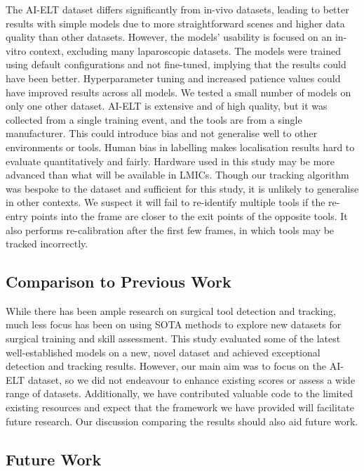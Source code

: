 The AI-ELT dataset differs significantly from in-vivo datasets, leading to better results with simple models due to more straightforward scenes and higher data quality than other datasets. However, the models' usability is focused on an in-vitro context, excluding many laparoscopic datasets. The models were trained using default configurations and not fine-tuned, implying that the results could have been better. Hyperparameter tuning and increased patience values could have improved results across all models. We tested a small number of models on only one other dataset. AI-ELT is extensive and of high quality, but it was collected from a single training event, and the tools are from a single manufacturer. This could introduce bias and not generalise well to other environments or tools. Human bias in labelling makes localisation results hard to evaluate quantitatively and fairly. Hardware used in this study may be more advanced than what will be available in LMICs. Though our tracking algorithm was bespoke to the dataset and sufficient for this study, it is unlikely to generalise in other contexts. We suspect it will fail to re-identify multiple tools if the re-entry points into the frame are closer to the exit points of the opposite tools. It also performs re-calibration after the first few frames, in which tools may be tracked incorrectly.

\subsection{Comparison to Previous Work}

While there has been ample research on surgical tool detection and tracking, much less focus has been on using SOTA methods to explore new datasets for surgical training and skill assessment. This study evaluated some of the latest well-established models on a new, novel dataset and achieved exceptional detection and tracking results. However, our main aim was to focus on the AI-ELT dataset, so we did not endeavour to enhance existing scores or assess a wide range of datasets. Additionally, we have contributed valuable code to the limited existing resources and expect that the framework we have provided will facilitate future research. Our discussion comparing the results should also aid future work.

\subsection{Future Work}

